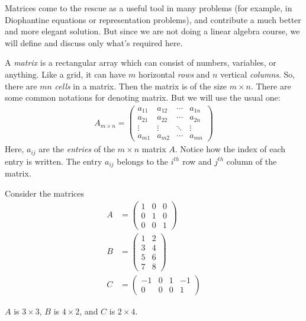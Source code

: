 	Matrices come to the rescue as a useful tool in many problems (for example, in Diophantine equations or representation problems), and contribute a much better and more elegant solution. But since we are not doing a linear algebra course, we will define and discuss only what's required here.

	\begin{definition}[Matrix]
		A \textit{matrix} is a rectangular array which can consist of numbers, variables, or anything. Like a grid, it can have $m$ horizontal \textit{rows} and $n$ vertical \textit{columns}. So, there are $mn$ \textit{cells} in a matrix. Then the matrix is of the size $m\times n$. There are some common notations for denoting matrix. But we will use the usual one:
		\begin{align*}
		{A_{m \times n}} = \begin{pmatrix}
			{{a_{11}}}&{{a_{12}}}& \cdots &{{a_{1n}}}\\
			{{a_{21}}}&{{a_{22}}}& \cdots &{{a_{2n}}}\\
			\vdots & \vdots & \ddots & \vdots \\
			{{a_{m1}}}&{{a_{m2}}}& \cdots &{{a_{mn}}}
			\end{pmatrix}
			\end{align*}
		Here, $a_{ij}$ are the \textit{entries} of the $m\times n$ matrix $A$. Notice how the index of each entry is written. The entry $a_{ij}$ belongs to the $i^{th}$ row and $j^{th}$ column of the matrix.
	\end{definition}

	\begin{example}
	Consider the matrices
		\begin{align*}
		A
			&
			= \begin{pmatrix}
			1&0&0\\
			0&1&0\\
			0&0&1
			\end{pmatrix}\\
		B
			&
			= \begin{pmatrix}
			1&2\\
			3&4\\
			5&6\\
			7&8
			\end{pmatrix}\\
		C
			&
			= \begin{pmatrix}
			{ - 1}&0&1&{ - 1}\\
			0&0&0&1
			\end{pmatrix}
		\end{align*}

	$A$ is $3\times 3$, $B$ is $4\times 2$, and $C$ is $2 \times 4$.
	\end{example}

